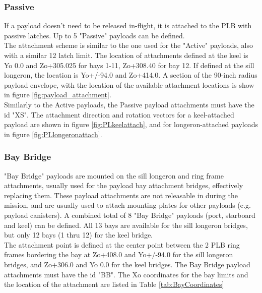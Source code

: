 \documentclass[Space_Shuttle_Vessel_Manual.tex]{subfiles}
\begin{document}
\begin{multicols*}{2}
\subsubsection{Passive}
If a payload doesn't need to be released in-flight, it is attached to the PLB with passive latches. Up to 5 "Passive" payloads can be defined.
\\
The attachment scheme is similar to the one used for the "Active" payloads, also with a similar 12 latch limit. The location of attachments defined at the keel is Yo 0.0 and Zo+305.025 for bays 1-11, Zo+308.40 for bay 12. If defined at the sill longeron, the location is Yo+/-94.0 and Zo+414.0. A section of the 90-inch radius payload envelope, with the location of the available attachment locations is show in figure \ref{fig:payload_attachment}.
\\
Similarly to the Active payloads, the Passive payload attachments must have the id "XS". The attachment direction and rotation vectors for a keel-attached payload are shown in figure \ref{fig:PLkeelattach}, and for longeron-attached payloads in figure \ref{fig:PLlongeronattach}.


\subsubsection{Bay Bridge}
"Bay Bridge" payloads are mounted on the sill longeron and ring frame attachments, usually used for the payload bay attachment bridges, effectively replacing them. These payload attachments are not releasable in during the mission, and are usually used to attach mounting plates for other payloads (e.g. payload canisters). A combined total of 8 "Bay Bridge" payloads (port, starboard and keel) can be defined. All 13 bays are available for the sill longeron bridges, but only 12 bays (1 thru 12) for the keel bridge.
\\
The attachment point is defined at the center point between the 2 PLB ring frames bordering the bay at Zo+408.0 and Yo+/-94.0 for the sill longeron bridges, and Zo+306.0 and Yo 0.0 for the keel bridges. The Bay Bridge payload attachments must have the id "BB". The Xo coordinates for the bay limits and the location of the attachment are listed in Table \ref{tab:BayCoordinates}



\end{multicols*}
\end{document}
